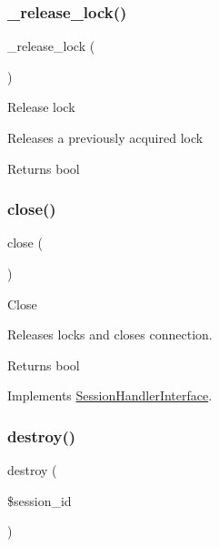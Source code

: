 \subsubsection{\texorpdfstring{\+\_\+release\+\_\+lock()}{\_release\_lock()}}
{\footnotesize\ttfamily \+\_\+release\+\_\+lock (\begin{DoxyParamCaption}{ }\end{DoxyParamCaption})\hspace{0.3cm}{\ttfamily [protected]}}

Release lock

Releases a previously acquired lock

\begin{DoxyReturn}{Returns}
bool 
\end{DoxyReturn}
\mbox{\label{class_c_i___session__redis__driver_aa69c8bf1f1dcf4e72552efff1fe3e87e}} 
\subsubsection{\texorpdfstring{close()}{close()}}
{\footnotesize\ttfamily close (\begin{DoxyParamCaption}{ }\end{DoxyParamCaption})}

Close

Releases locks and closes connection.

\begin{DoxyReturn}{Returns}
bool 
\end{DoxyReturn}


Implements \mbox{\hyperlink{interface_session_handler_interface_aa69c8bf1f1dcf4e72552efff1fe3e87e}{Session\+Handler\+Interface}}.

\mbox{\label{class_c_i___session__redis__driver_aaec5812f6b4eb6835f88d3baa06a002a}} 
\subsubsection{\texorpdfstring{destroy()}{destroy()}}
{\footnotesize\ttfamily destroy (\begin{DoxyParamCaption}\item[{}]{\$session\+\_\+id }\end{DoxyParamCaption})}


